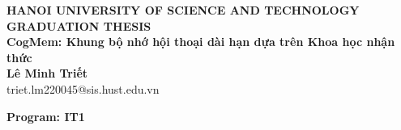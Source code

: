 \documentclass[Main.tex]{subfiles}
\begin{document}
\begin{titlepage}
\thispagestyle{empty}
\begin{center}

{\textbf{\large{HANOI UNIVERSITY OF SCIENCE AND TECHNOLOGY}}}\\[4cm]

{\textbf{\huge{GRADUATION THESIS}}}\\[1cm]
{\textbf{\Large{CogMem: Khung bộ nhớ hội thoại dài hạn dựa trên Khoa học nhận thức}}}\\[0.5cm]

{\textbf{\large{Lê Minh Triết}}}\\
{\large{triet.lm220045@sis.hust.edu.vn}}\\[0.5cm]

{\textbf{\large{Program: IT1}}\\[0.5cm]

\vspace{4cm}
\begin{table}[H]
\centering
{}
\end{table}}
\end{center}

\end{titlepage}
\end{document}
